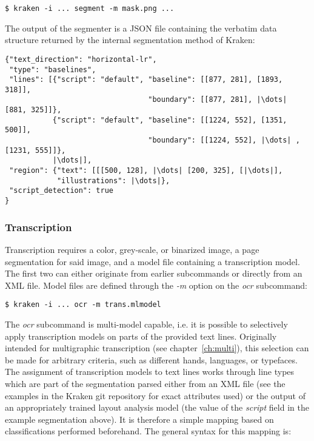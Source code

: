 \begin{verbatim}
$ kraken -i ... segment -m mask.png ...
\end{verbatim}

The output of the segmenter is a JSON file containing the verbatim data
structure returned by the internal segmentation method of Kraken:

\begin{verbatim}
{"text_direction": "horizontal-lr",
 "type": "baselines",
 "lines": [{"script": "default", "baseline": [[877, 281], [1893, 318]],
                                 "boundary": [[877, 281], |\dots| [881, 325]]},
           {"script": "default", "baseline": [[1224, 552], [1351, 500]],
                                 "boundary": [[1224, 552], |\dots| , [1231, 555]]},
           |\dots|],
 "region": {"text": [[[500, 128], |\dots| [200, 325], [|\dots|],
            "illustrations": |\dots|},
 "script_detection": true
}
\end{verbatim}

\subsubsection{Transcription}

Transcription requires a color, grey-scale, or binarized image, a page
segmentation for said image, and a model file containing a transcription model.
The first two can either originate from earlier subcommands or directly from
an XML file. Model files are defined through the \emph{-m} option on the
\emph{ocr} subcommand:

\begin{verbatim}
$ kraken -i ... ocr -m trans.mlmodel
\end{verbatim}

The \emph{ocr} subcommand is multi-model capable, i.e. it is possible to
selectively apply transcription models on parts of the provided text lines.
Originally intended for multigraphic transcription (see
chapter~\ref{ch:multi}), this selection can be made for arbitrary criteria,
such as different hands, languages, or typefaces. The assignment of
transcription models to text lines works through line types which are part of
the segmentation parsed either from an XML file (see the examples in the Kraken
git repository for exact attributes used) or the output of an appropriately
trained layout analysis model (the value of the \emph{script} field in the
example segmentation above). It is therefore a simple mapping based on
classifications performed beforehand. The general syntax for this mapping is:

